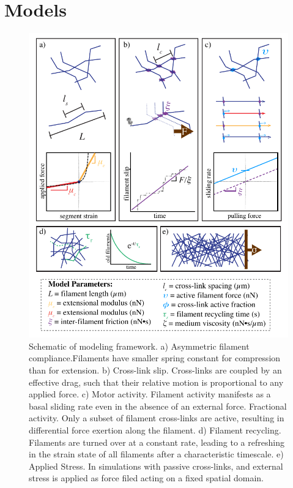\documentclass[10pt,letterpaper]{article}
\begin{document}
\section*{Models}

\begin{figure}[h!]
\centering
\includegraphics[width=\hsize]{figures/fig2/fig2}
\caption{\label{fig:sim} Schematic of modeling framework. a) Asymmetric filament compliance.Filaments have smaller spring constant for compression than for extension. b) Cross-link slip. Cross-links are coupled by an effective drag, such that their relative motion is
proportional to any applied force. c) Motor activity. Filament activity manifests as a basal sliding rate even in the absence of an external force. Fractional activity. Only a subset of filament cross-links are active, resulting in differential force exertion along the filament. d) Filament recycling. Filaments are turned over at a constant rate, leading to a refreshing in the strain state of all filaments after a characteristic timescale. e) Applied Stress. In simulations with passive cross-links, and external stress is applied as force filed acting on a fixed spatial domain.}
\end{figure}
\end{document}
